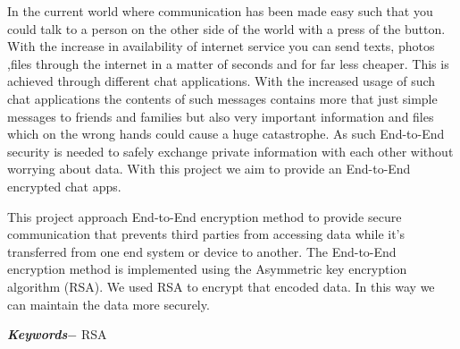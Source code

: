 In the current world where communication has been made easy such that you could talk to a person on the other side of the world with a press of the button. With the increase in availability of internet service you can send texts, photos ,files through the internet in a matter of seconds and for far less cheaper. This is achieved through different chat applications. With the increased usage of such chat applications the contents of such messages contains more that just simple messages to friends and families but also very important information and files which on the wrong hands could cause a huge catastrophe. As such End-to-End security is needed to safely exchange private information with each other without worrying about data. With this project we aim to provide an End-to-End encrypted chat apps.

This project approach End-to-End encryption method to provide  secure communication that prevents third parties from accessing data while it's transferred from one end system or device to another.
The End-to-End encryption method is implemented using the Asymmetric key encryption algorithm (RSA). We used RSA to encrypt that encoded data.
In this way we can maintain the data more securely.


\par
\textbf{\textit{Keywords$-$}} RSA


